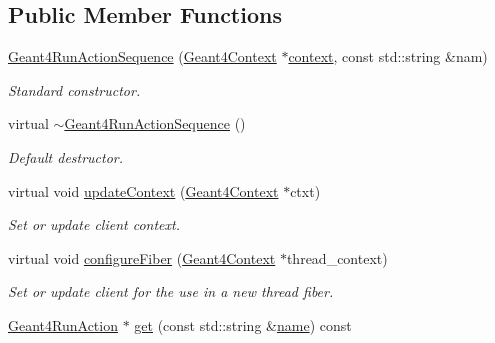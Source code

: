 \subsection*{Public Member Functions}
\begin{DoxyCompactItemize}
\item 
\hyperlink{class_d_d4hep_1_1_simulation_1_1_geant4_run_action_sequence_adbd525bcacdb9655df38196c1ce6a1a3}{Geant4\+Run\+Action\+Sequence} (\hyperlink{class_d_d4hep_1_1_simulation_1_1_geant4_context}{Geant4\+Context} $\ast$\hyperlink{class_d_d4hep_1_1_simulation_1_1_geant4_action_aa9d87f0ec2a72b7fc2591b18f98d75cf}{context}, const std\+::string \&nam)
\begin{DoxyCompactList}\small\item\em Standard constructor. \end{DoxyCompactList}\item 
virtual \hyperlink{class_d_d4hep_1_1_simulation_1_1_geant4_run_action_sequence_a4489dd79f6a419c4788a73efd50f6024}{$\sim$\+Geant4\+Run\+Action\+Sequence} ()
\begin{DoxyCompactList}\small\item\em Default destructor. \end{DoxyCompactList}\item 
virtual void \hyperlink{class_d_d4hep_1_1_simulation_1_1_geant4_run_action_sequence_ad94eee6a819a88302a0eaa0874d88fa3}{update\+Context} (\hyperlink{class_d_d4hep_1_1_simulation_1_1_geant4_context}{Geant4\+Context} $\ast$ctxt)
\begin{DoxyCompactList}\small\item\em Set or update client context. \end{DoxyCompactList}\item 
virtual void \hyperlink{class_d_d4hep_1_1_simulation_1_1_geant4_run_action_sequence_adf657c521620857ffed702783c0a2712}{configure\+Fiber} (\hyperlink{class_d_d4hep_1_1_simulation_1_1_geant4_context}{Geant4\+Context} $\ast$thread\+\_\+context)
\begin{DoxyCompactList}\small\item\em Set or update client for the use in a new thread fiber. \end{DoxyCompactList}\item 
\hyperlink{class_d_d4hep_1_1_simulation_1_1_geant4_run_action}{Geant4\+Run\+Action} $\ast$ \hyperlink{class_d_d4hep_1_1_simulation_1_1_geant4_run_action_sequence_acabb383c59fa2e37bb98a13501443e0b}{get} (const std\+::string \&\hyperlink{class_d_d4hep_1_1_simulation_1_1_geant4_action_af374e70b014d16afb81dd9d77cc3894b}{name}) const

\end{DoxyCompactItemize}
